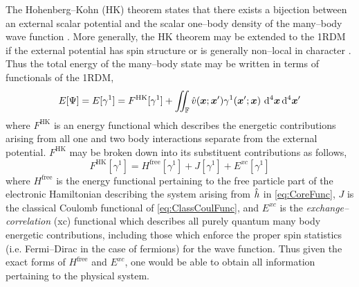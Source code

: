 The Hohenberg--Kohn (HK) theorem states that there exists a bijection between
an external scalar potential and the scalar one--body density of the many--body
wave function . More generally, the HK theorem may be
extended to the 1RDM if the external potential has spin structure or is
generally non--local in character . Thus the total energy of
the many--body state may be written in terms of functionals of the 1RDM,
\begin{equation}
  \label{eq:HK}
  E[\Psi] = E[\gamma^1] = F^\mathrm{HK}[\gamma^1] + 
    \int\mkern-12mu\int_\mathbb{F} \hat{v}(\boldsymbol{x};\boldsymbol{x}') \gamma^1(\boldsymbol{x}'; \boldsymbol{x})\, \,\mathrm{d}^4\boldsymbol{x}\,\mathrm{d}^4\boldsymbol{x}'
\end{equation}
where $F^\mathrm{HK}$ is an energy functional which describes the energetic contributions arising from 
all one and two body interactions separate from the external potential. $F^\mathrm{HK}$ may be
broken down into its substituent contributions as follows,
\begin{equation}
  \label{eq:HKFunc}
  F^\mathrm{HK}[\gamma^1] = H^\mathrm{free}[\gamma^1] + J[\gamma^1] + E^{xc}[\gamma^1]
\end{equation}
where $H^\mathrm{free}$ is the energy functional pertaining to the free particle part of the electronic Hamiltonian
describing the system arising from $\hat{h}$ in \cref{eq:CoreFunc}, $J$ is the classical Coulomb functional of \cref{eq:ClassCoulFunc}, and $E^{xc}$ is the
\emph{exchange--correlation} (xc) functional which describes all purely quantum many body energetic contributions, including those
which enforce the proper spin statistics (i.e. Fermi--Dirac in the case of fermions) for the wave function. 
Thus given the exact forms of $H^\mathrm{free}$ and $E^{xc}$, one would be able to  obtain all information pertaining 
to the physical system.


